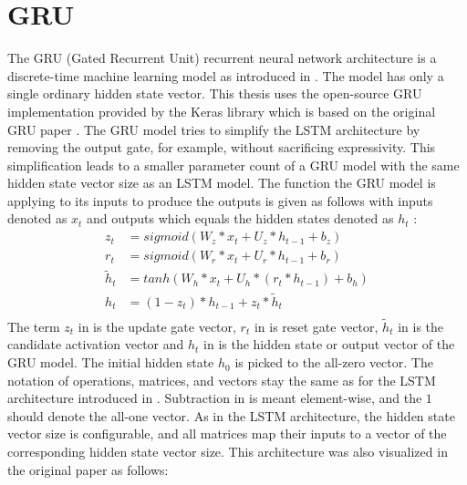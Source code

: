 \documentclass[draft,final]{vutinfth} %
\begin{document}
    \section{GRU} \label{gru}
    The GRU (Gated Recurrent Unit) recurrent neural network architecture is a discrete-time machine learning model as introduced in .
    The model has only a single ordinary hidden state vector.
    This thesis uses the open-source GRU implementation provided by the Keras library \cite{Keras} which is based on the original GRU paper \cite{GRU}.
    The GRU model tries to simplify the LSTM architecture by removing the output gate, for example, without sacrificing expressivity.
    This simplification leads to a smaller parameter count of a GRU model with the same hidden state vector size as an LSTM model.
    The function the GRU model is applying to its inputs to produce the outputs is given as follows with inputs denoted as $x_t$ and outputs which equals the hidden states denoted as $h_t$ \cite[p. 4]{GRU}:
    \begin{align}
        \label{update_gate} z_t &= sigmoid(W_z*x_t + U_z*h_{t-1} + b_z) \\
        \label{reset_gate} r_t &= sigmoid(W_r*x_t + U_r*h_{t-1} + b_r) \\
        \label{candidate_activation_vector} \tilde{h}_t &= tanh(W_h*x_t + U_h*(r_t * h_{t-1}) + b_h) \\
        \label{output_vector} h_t &= (1 - z_t) * h_{t-1} + z_t * \tilde{h}_t \\
    \end{align}
    The term $z_t$ in  is the update gate vector, $r_t$ in  is reset gate vector, $\tilde{h}_t$ in  is the candidate activation vector and $h_t$ in  is the hidden state or output vector of the GRU model.
    The initial hidden state $h_0$ is picked to the all-zero vector.
    The notation of operations, matrices, and vectors stay the same as for the LSTM architecture introduced in .
    Subtraction in  is meant element-wise, and the $1$ should denote the all-one vector.
    As in the LSTM architecture, the hidden state vector size is configurable, and all matrices map their inputs to a vector of the corresponding hidden state vector size.
    This architecture was also visualized in the original paper as follows:
\end{document}
